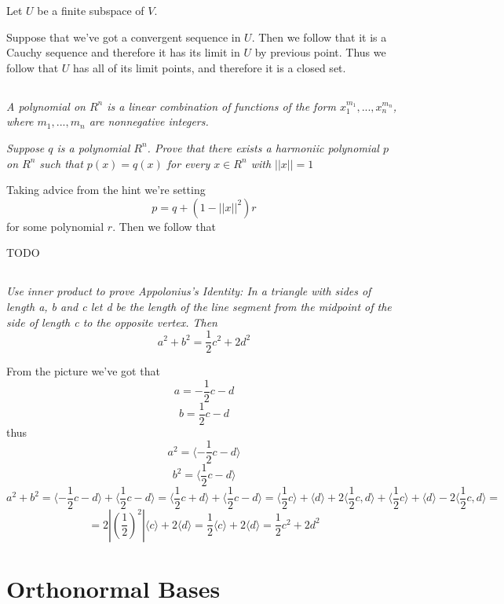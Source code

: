 \documentclass[11pt,oneside,titlepage]{book}
\newcommand{\eangle}[1]{\langle #1 \rangle}
\begin{document}
Let $U$ be a finite subspace of $V$.

Suppose that we've got a convergent sequence in $U$. Then we follow that it is a Cauchy sequence
and therefore it has its limit in $U$ by previous point. Thus we follow that $U$ has
all of its limit points, and therefore it is a closed set.

\subsection{}

\textit{A polynomial on $R^n$ is a linear combination of functions of the form
  $x_1^{m_1}, ..., x_n^{m_n}$, where $m_1, ..., m_n$ are nonnegative integers.}

\textit{Suppose $q$ is a polynomial $R^n$.
  Prove that there exists a harmoniic polynomial $p$ on $R^n$ such that
  $p(x) = q(x)$ for every $x \in R^n$ with $||x|| = 1$}

Taking advice from the hint we're setting
$$p = q + (1 - ||x||^2)r$$
for some polynomial $r$. Then we follow that

TODO

\subsection{}

\textit{Use inner product to prove Appolonius's Identity: In a triangle with sides of length a, b
  and c let d be the length of the line segment from the midpoint of the side of length c to the
  opposite vertex. Then}
$$a^2 + b^2 = \frac{1}{2} c^2 + 2d^2$$

From the picture we've got that
$$a = - \frac{1}{2}c - d$$
$$b = \frac{1}{2}c - d$$
thus
$$a^2 = \eangle{- \frac{1}{2}c - d}$$
$$b^2 = \eangle{\frac{1}{2}c - d}$$
$$a^2 + b^2 = \eangle{-\frac{1}{2}c - d} + \eangle{\frac{1}{2}c - d} =
\eangle{\frac{1}{2}c + d} + \eangle{\frac{1}{2}c - d} =
\eangle{\frac 1 2 c} + \eangle{d} + 2\eangle{\frac{1}{2}c, d} + \eangle{\frac{1}{2}c} + \eangle{d}
- 2\eangle{\frac{1}{2}c, d} = $$
$$ = 2|(\frac{1}{2})^2|\eangle{ c} + 2\eangle{d}  = \frac{1}{2} \eangle{c} + 2\eangle{d} =
\frac{1}{2}c^2 + 2d^2$$

\section{Orthonormal Bases}

\subsection{}
\end{document}
